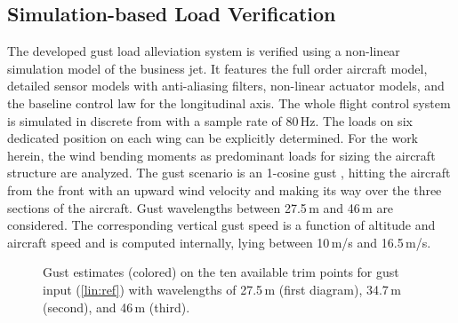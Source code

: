 \documentclass[graybox]{svmult}
\begin{document}
\subsection{Simulation-based Load Verification}\label{APPsubsec:sim}\vspace{-1mm}
The developed gust load alleviation system is verified using a non-linear simulation model of the business jet. It features the full order aircraft model, detailed sensor models with anti-aliasing filters, non-linear actuator models, and the baseline control law for the longitudinal axis. The whole flight control system is simulated in discrete from with a sample rate of 80\,Hz. The loads on six dedicated position on each wing can be explicitly determined. For the work herein, the wind bending moments as predominant loads for sizing the aircraft structure are analyzed.
The gust scenario is an 1-cosine gust \cite{Flomenhoft94,Fuller95}, hitting the aircraft from the front  with an upward  wind velocity and making its way over the three sections of the aircraft.
Gust wavelengths between  27.5\,m and 46\,m are considered. The corresponding vertical gust speed  is a function of altitude and aircraft speed and is computed internally, lying between 10\,m/s and 16.5\,m/s.


\begin{figure}[b!]
	\sidecaption[]
	
	\caption{Gust estimates (colored) on the ten available trim points for gust input (\ref{lin:ref}) with wavelengths of 27.5\,m (first diagram), 34.7\,m (second), and 46\,m (third).}
	\label{fig:est}
\end{figure} 
\end{document}
